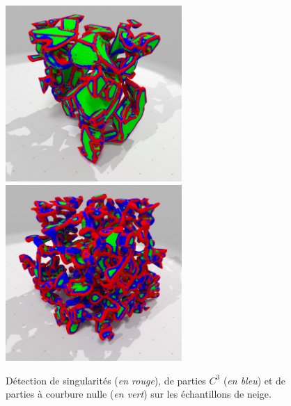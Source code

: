 \begin{figure}[ht]{
    \begin{center}
    \includegraphics[width=6.7cm]{images/digitalSnow/Snow_E2bis_II_scale}
    \includegraphics[width=6.7cm]{images/digitalSnow/Snow_I08_II_scale}\\
    \end{center}}
    \caption{Détection de singularités (\emph{en rouge}), de parties $C^3$ (\emph{en bleu}) et de parties à courbure nulle (\emph{en vert}) sur les échantillons de neige.
      \label{fig:digitalSnow-sing}}
\end{figure}

